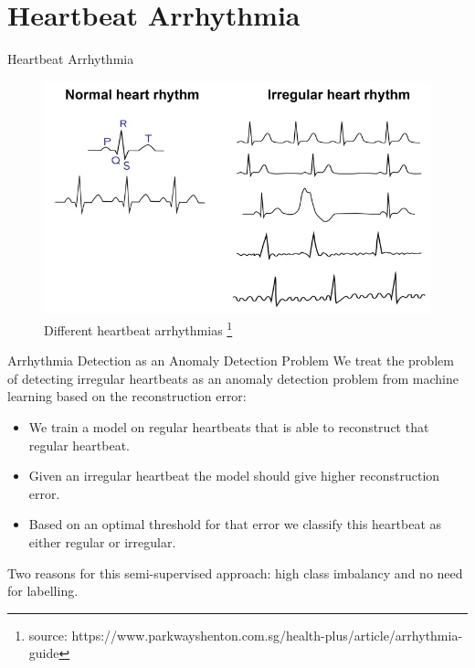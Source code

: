 \section{Heartbeat Arrhythmia}
\begin{frame}{Heartbeat Arrhythmia}
    \begin{figure}
        \centering
        \includegraphics[scale=0.3]{images/heartbeat_arr.png}
        \caption[]{Different heartbeat arrhythmias \footnote{source: https://www.parkwayshenton.com.sg/health-plus/article/arrhythmia-guide}}
        \label{fig:enter-label}
    \end{figure}
\end{frame}

\begin{frame}{Arrhythmia Detection as an Anomaly Detection Problem}
We treat the problem of detecting irregular heartbeats as an anomaly detection problem from machine learning based on the reconstruction error:
\begin{itemize}
    \item We train a model on regular heartbeats that is able to reconstruct that regular heartbeat.
    \item Given an irregular heartbeat the model should give higher reconstruction error.
    \item Based on an optimal threshold for that error we classify this heartbeat as either regular or irregular.
\end{itemize}
    Two reasons for this semi-supervised approach: high class imbalancy and no need for labelling.
\end{frame} 

